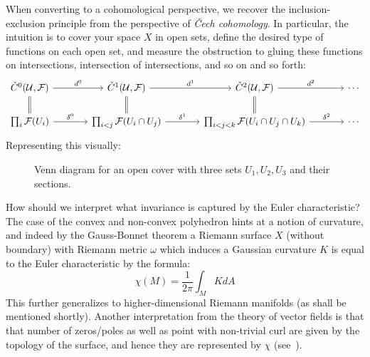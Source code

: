\documentclass{book}
\newcommand{\CF}{{\mathcal{F}}}
\begin{document}
When converting to a cohomological perspective, we recover the inclusion-exclusion principle from the
perspective of \emph{\v{C}ech cohomology}. In particular, the intuition is to cover your space $X$ in open
sets, define the desired type of functions on each open set, and measure the obstruction to gluing these
functions on intersections, intersection of intersections, and so on and so forth:
\[
\begin{tikzcd}[column sep=large]
\check{C}^0(\mathcal{U}, \CF) \arrow[r, "d^0"] & \check{C}^1(\mathcal{U}, \CF) \arrow[r, "d^1"] & \check{C}^2(\mathcal{U}, \CF) \arrow[r, "d^2"] & \cdots \\
\prod_{i} \CF(U_i) \arrow[u, equal] \arrow[r, "\delta^0"] & \prod_{i<j} \CF(U_i \cap U_j) \arrow[u, equal] \arrow[r, "\delta^1"] & \prod_{i<j<k} \CF(U_i \cap U_j \cap U_k) \arrow[u, equal] \arrow[r, "\delta^2"] & \cdots
\end{tikzcd}
\]
Representing this visually:

\begin{figure}[H]
\centering
{}
\caption{Venn diagram for an open cover with three sets $U_1, U_2, U_3$ and their sections.}
\end{figure}

How should we interpret what invariance is captured by the Euler characteristic? The case of the convex and
non-convex polyhedron hints at a notion of curvature, and indeed by the Gauss-Bonnet theorem a Riemann surface
$X$ (without boundary) with Riemann metric $\omega$ which induces a Gaussian curvature $K$ is equal to the
Euler characteristic by the formula:
\[
  \chi(M) = \frac{1}{2\pi }\int_M K dA
\]
This further generalizes to higher-dimensional Riemann manifolds (as shall be mentioned shortly). Another
interpretation from the theory of vector fields is that that number of zeros/poles as well as point with
non-trivial curl are given by the topology of the surface, and hence they are represented by $\chi$
(see~\cite{NateAlgTop}).
\end{document}
